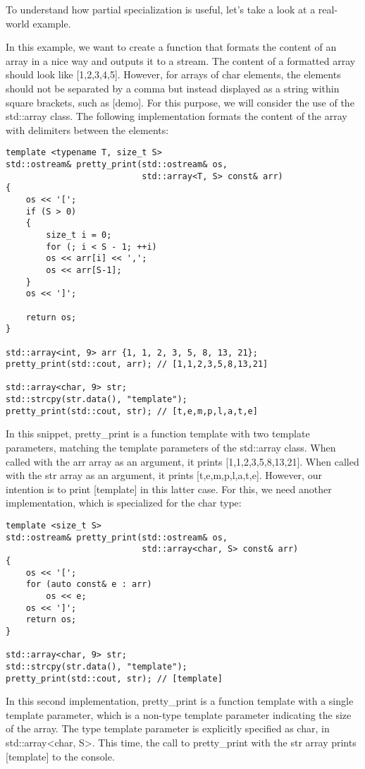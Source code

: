 To understand how partial specialization is useful, let's take a look at a real-world example.

In this example, we want to create a function that formats the content of an array in a nice way and outputs it to a stream. The content of a formatted array should look like [1,2,3,4,5]. However, for arrays of char elements, the elements should not be separated by a comma but instead displayed as a string within square brackets, such as [demo]. For this purpose, we will consider the use of the std::array class. The following implementation formats the content of the array with delimiters between the elements:

\begin{lstlisting}[style=styleCXX]
template <typename T, size_t S>
std::ostream& pretty_print(std::ostream& os,
                           std::array<T, S> const& arr)
{
	os << '[';
	if (S > 0)
	{
		size_t i = 0;
		for (; i < S - 1; ++i)
		os << arr[i] << ',';
		os << arr[S-1];
	}
	os << ']';
	
	return os;
}

std::array<int, 9> arr {1, 1, 2, 3, 5, 8, 13, 21};
pretty_print(std::cout, arr); // [1,1,2,3,5,8,13,21]

std::array<char, 9> str;
std::strcpy(str.data(), "template");
pretty_print(std::cout, str); // [t,e,m,p,l,a,t,e]
\end{lstlisting}

In this snippet, pretty\_print is a function template with two template parameters, matching the template parameters of the std::array class. When called with the arr array as an argument, it prints [1,1,2,3,5,8,13,21]. When called with the str array as an argument, it prints [t,e,m,p,l,a,t,e]. However, our intention is to print [template] in this latter case. For this, we need another implementation, which is specialized for the char type:

\begin{lstlisting}[style=styleCXX]
template <size_t S>
std::ostream& pretty_print(std::ostream& os,
						   std::array<char, S> const& arr)
{
	os << '[';
	for (auto const& e : arr)
		os << e;
	os << ']';
	return os;
}

std::array<char, 9> str;
std::strcpy(str.data(), "template");
pretty_print(std::cout, str); // [template]
\end{lstlisting}

In this second implementation, pretty\_print is a function template with a single template parameter, which is a non-type template parameter indicating the size of the array. The type template parameter is explicitly specified as char, in std::array<char, S>. This time, the call to pretty\_print with the str array prints [template] to the console.


